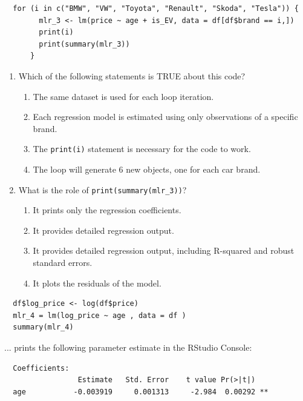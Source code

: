 \documentclass{article}
\begin{document}
\newpage

\begin{lstlisting}
  for (i in c("BMW", "VW", "Toyota", "Renault", "Skoda", "Tesla")) {
        mlr_3 <- lm(price ~ age + is_EV, data = df[df$brand == i,])
        print(i)
        print(summary(mlr_3))
      }
\end{lstlisting}

\begin{enumerate}[resume]
  \item Which of the following statements is TRUE about this code?
  \begin{enumerate}[label=\Alph*)]
    \item The same dataset is used for each loop iteration.
    \item Each regression model is estimated using only observations of a specific brand.
    \item The \texttt{print(i)} statement is necessary for the code to work.
    \item The loop will generate 6 new objects, one for each car brand.
  \end{enumerate}
    \item What is the role of \texttt{print(summary(mlr\_3))}?

  \begin{enumerate}[label=\Alph*)]
    \item It prints only the regression coefficients.
    \item It provides detailed regression output.
    \item It provides detailed regression output, including R-squared and robust standard errors.
    \item It plots the residuals of the model.
  \end{enumerate}
\end{enumerate}

\newpage

\begin{lstlisting}
  df$log_price <- log(df$price)
  mlr_4 = lm(log_price ~ age , data = df )
  summary(mlr_4)
\end{lstlisting}
... prints the following parameter estimate in the RStudio Console:
\begin{verbatim}
  Coefficients:
                 Estimate   Std. Error    t value Pr(>|t|)    
  age           -0.003919     0.001313     -2.984  0.00292 ** 
\end{verbatim}
\end{document}
